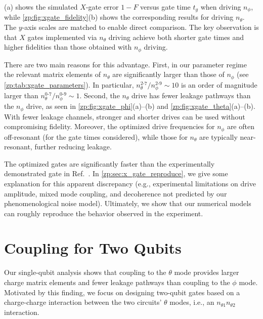 (a) shows the simulated $X$-gate error $1-F$ versus gate time $t_g$ when driving $n_\phi$, while \cref{zp:fig:xgate_fidelity}(b) shows the corresponding results for driving $n_\theta$.
The $y$-axis scales are matched to enable direct comparison.
The key observation is that $X$ gates implemented via $n_\theta$ driving achieve both shorter gate times and higher fidelities than those obtained with $n_\phi$ driving.

There are two main reasons for this advantage.
First, in our parameter regime the relevant matrix elements of $n_\theta$ are significantly larger than those of $n_\phi$ (see \cref{zp:tab:xgate_parameters}).
In particular, $n_\theta^{2\text{-}7}/n_\phi^{2\text{-}9}\sim 10$ is an order of magnitude larger than $n_\theta^{0\text{-}7}/n_\phi^{0\text{-}9}\sim 1$.
Second, the $n_\theta$ drive has fewer leakage pathways than the $n_\phi$ drive, as seen in \cref{zp:fig:xgate_phi}(a)–(b) and \cref{zp:fig:xgate_theta}(a)–(b).
With fewer leakage channels, stronger and shorter drives can be used without compromising fidelity.
Moreover, the optimized drive frequencies for $n_\phi$ are often off-resonant (for the gate times considered), while those for $n_\theta$ are typically near-resonant, further reducing leakage.

The optimized gates are significantly faster than the experimentally demonstrated gate in Ref.~\cite{Gyenis_zero_pi_2021a}.
In \cref{zp:sec:x_gate_reproduce}, we give some explanation for this apparent discrepancy (e.g., experimental limitations on drive amplitude, mixed mode coupling, and decoherence not predicted by our phenomenological noise model).
Ultimately, we show that our numerical models can roughly reproduce the behavior observed in the experiment.

\section{ Coupling for Two \texorpdfstring{\zp}{zero pi} Qubits} \label{zp:sec:coupling}
Our single-qubit analysis shows that coupling to the $\theta$ mode provides larger charge matrix elements and fewer leakage pathways than coupling to the $\phi$ mode.
Motivated by this finding, we focus on designing two-qubit gates based on a charge-charge interaction between the two circuits' $\theta$ modes, i.e., an $n_{\theta1} n_{\theta2}$ interaction.

